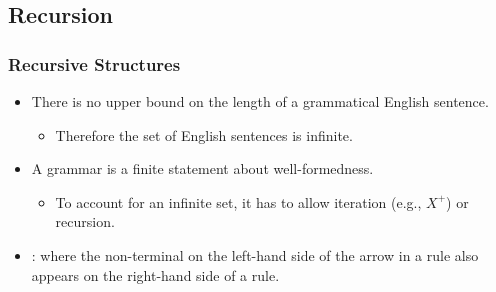 

\subsection{Recursion}

% 


\begin{frame}[fragile]
\frametitle{Recursive Structures}

\begin{itemize}
  
\item There is no upper bound on the length of a grammatical English
  sentence. 
  \begin{itemize}
    \item Therefore the set of English sentences is infinite.
\end{itemize}
  
\item A grammar is a finite statement about well-formedness. 
  \begin{itemize}
    
  \item To account for
  an infinite set, it has to allow iteration (e.g., $X^{+}$) or
  recursion.
  \end{itemize}
  
\item {}: where the non-terminal on the left-hand
  side of the arrow in a rule also appears on the right-hand side of a
  rule.
\end{itemize}


\end{frame}

